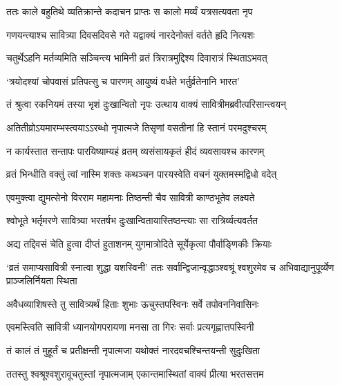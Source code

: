 \twolineshloka
{ततः काले बहुतिथे व्यतिक्रान्ते कदाचन}
{प्राप्तः स कालो मर्व्यं यत्रसत्यवता नृप}


\twolineshloka
{गणयन्त्याश्च सावित्र्या दिवसदिवसे गते}
{यद्वाक्यं नारदेनोक्तं वर्तते हृदि नित्यशः}


\twolineshloka
{चतुर्थेऽहनि मर्तव्यमिति सञ्चिन्त्य भामिनी}
{व्रतं त्रिरात्रमुद्दिश्य दिवारात्रं स्थिताऽभवत्}


\twolineshloka
{`त्रयोदश्यां चोपवासं प्रतिपत्सु च पारणम्}
{आयुष्यं वर्धते भर्तुर्व्रतेनानि भारत'}


\twolineshloka
{तं श्रुत्वा रकनियमं तस्या भृशं दुःखान्वितो नृपः}
{उत्थाय वाक्यं सावित्रीमब्रवीत्परिसान्त्वयन्}


\twolineshloka
{अतितीव्रोऽयमारम्भस्त्वयाऽऽरब्धो नृपात्मजे}
{तिसृणां वसतीनां हि स्तानं परमदुश्चरम्}




\twolineshloka
{न कार्यस्तात सन्तापः पारयिष्याम्यहं व्रतम्}
{व्यसंसायकृतं हीदं व्यवसायश्च कारणम्}




\twolineshloka
{व्रतं भिन्धीति वक्तुं त्वां नास्मि शक्तः कथञ्चन}
{पारयस्वेति वचनं युक्तमस्मद्विधो वदेत्}




\twolineshloka
{एवमुक्त्वा द्युमत्सेनो विरराम महामनाः}
{तिष्ठन्ती चैव सावित्री काण्ठभूतेव लक्ष्यते}


\twolineshloka
{श्वोभूते भर्तृमरणे सावित्र्या भरतर्षभ}
{दुःखान्वितायास्तिष्ठन्त्याः सा रात्रिर्व्यत्यवर्तत}


\twolineshloka
{अद्य तद्दिवसं चेति हुत्वा दीप्तं हुताशनम्}
{युगमात्रोदिते सूर्येकृत्वा पौर्वाङ्णिकीः क्रियाः}


\threelineshloka
{`व्रतं समाप्यसावित्री स्नात्वा शुद्धा यशस्विनी'}
{ततः सर्वान्द्विजान्वृद्धाञ्श्वश्रूं श्वशुरमेव च}
{अभिवाद्यानुपूर्व्येण प्राञ्जलिर्नियता स्थिता}


\twolineshloka
{अवैधव्याशिषस्ते तु सावित्र्यर्थं हिताः शुभाः}
{ऊचुस्तपस्विनः सर्वे तपोवननिवासिनः}


\twolineshloka
{एवमस्त्विति सावित्री ध्यानयोगपरायणा}
{मनसा ता गिरः सर्वाः प्रत्यगृह्णात्तपस्विनी}


\twolineshloka
{तं कालं तं मुहूर्तं च प्रतीक्षन्ती नृपात्मजा}
{यथोक्तं नारदवचश्चिन्तयन्ती सुदुःखिता}


\twolineshloka
{ततस्तु श्वश्रूश्वशुरावूचतुस्तां नृपात्मजाम्}
{एकान्तमास्थितां वाक्यं प्रीत्या भरतसत्तम}


